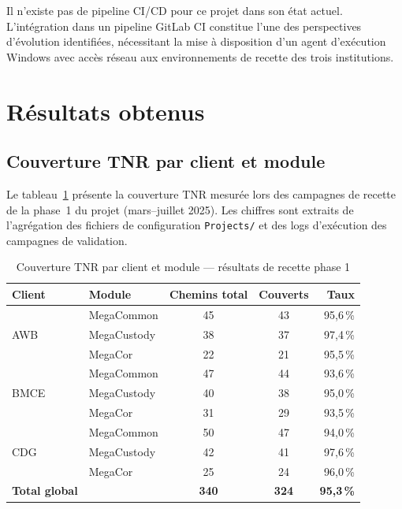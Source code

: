 \documentclass[12pt, a4paper]{report}
\begin{document}
Il n'existe pas de pipeline CI/CD pour ce projet dans son état actuel. L'intégration dans un pipeline GitLab CI constitue l'une des perspectives d'évolution identifiées, nécessitant la mise à disposition d'un agent d'exécution Windows avec accès réseau aux environnements de recette des trois institutions.

\section{Résultats obtenus}

\subsection{Couverture TNR par client et module}

Le tableau~\ref{tab:coverage} présente la couverture TNR mesurée lors des campagnes de recette de la phase~1 du projet (mars–juillet 2025). Les chiffres sont extraits de l'agrégation des fichiers de configuration \texttt{Projects/} et des logs d'exécution des campagnes de validation.

\begin{table}[H]
\centering
\caption{Couverture TNR par client et module — résultats de recette phase 1}
\label{tab:coverage}
\begin{tabular}{llccr}
\toprule
\textbf{Client} & \textbf{Module}    & \textbf{Chemins total} & \textbf{Couverts} & \textbf{Taux} \\
\midrule
\multirow{3}{*}{AWB}
  & MegaCommon   & 45 & 43 & 95,6\,\% \\
  & MegaCustody  & 38 & 37 & 97,4\,\% \\
  & MegaCor      & 22 & 21 & 95,5\,\% \\
\midrule
\multirow{3}{*}{BMCE}
  & MegaCommon   & 47 & 44 & 93,6\,\% \\
  & MegaCustody  & 40 & 38 & 95,0\,\% \\
  & MegaCor      & 31 & 29 & 93,5\,\% \\
\midrule
\multirow{3}{*}{CDG}
  & MegaCommon   & 50 & 47 & 94,0\,\% \\
  & MegaCustody  & 42 & 41 & 97,6\,\% \\
  & MegaCor      & 25 & 24 & 96,0\,\% \\
\midrule
\textbf{Total global}
  & & \textbf{340} & \textbf{324} & \textbf{95,3\,\%} \\
\bottomrule
\end{tabular}
\end{table}
\end{document}

